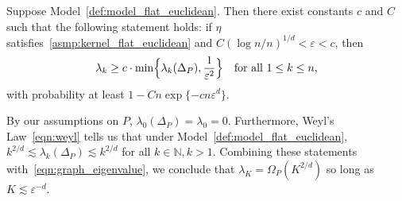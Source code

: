 \begin{proposition}
	\label{prop:graph_eigenvalue}
	Suppose Model~\ref{def:model_flat_euclidean}. Then there exist constants $c$ and $C$ such that the following statement holds: if $\eta$ satisfies~\ref{asmp:kernel_flat_euclidean} and $C(\log n/n)^{1/d} < \varepsilon < c$, then
	\begin{equation}
	\label{eqn:graph_eigenvalue}
	\lambda_k \geq c \cdot \min\Bigl\{\lambda_k(\Delta_P), \frac{1}{\varepsilon^{2}} \Bigr\} \quad \textrm{for all $1 \leq k \leq n$,}
	\end{equation}
	with probability at least $1 - Cn\exp\{-c n\varepsilon^d\}$. 
\end{proposition}
By our assumptions on $P$, $\lambda_0(\Delta_P) = \lambda_0 = 0$. Furthermore, Weyl's Law~\eqref{eqn:weyl} tells us that under Model~\ref{def:model_flat_euclidean}, $k^{2/d} \lesssim \lambda_{k}(\Delta_P) \lesssim k^{2/d}$ for all $k \in \mathbb{N}, k > 1$. Combining these statements with~\eqref{eqn:graph_eigenvalue}, we conclude that $\lambda_{K} = \Omega_P(K^{2/d})$ so long as $K \lesssim \varepsilon^{-d}$. 

